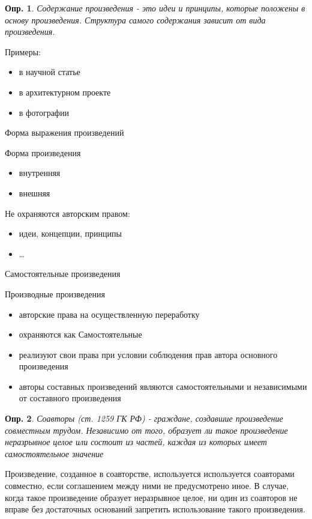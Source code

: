 \documentclass[12pt]{article}
\newtheorem{definition}{Опр.}
\begin{document}
\begin{definition}
Содержание произведения - это идеи и принципы, которые положены в основу
произведения. Структура самого содержания зависит от вида произведения.
\end{definition}

Примеры:
\begin{itemize}
\item в научной статье
\item в архитектурном проекте
\item в фотографии
\end{itemize}

Форма выражения произведений

Форма произведения
\begin{itemize}
\item внутренняя
\item внешняя
\end{itemize}

Не охраняются авторским правом:
\begin{itemize}
\item идеи, концепции, принципы
\item \dots
\end{itemize}

Самостоятельные произведения

Производные произведения
\begin{itemize}
\item авторские права на осуществленную переработку
\item охраняются как Самостоятельные
\item реализуют свои права при условии соблюдения прав автора
основного произведения
\item авторы составных произведений являются самостоятельными
и независимыми от составного произведения
\end{itemize}

\begin{definition}
Соавторы (ст. 1259 ГК РФ) - граждане, создавшие произведение 
совместным трудом. Независимо от того, образует ли такое произведение
неразрывное целое или состоит из частей, каждая из которых имеет 
самостоятельное значение
\end{definition}

Произведение, созданное в соавторстве, используется используется соавторами совместно, если соглашением между ними не предусмотрено иное. В случае, когда такое произведение образует неразрывное целое, ни один из соавторов не вправе без достаточных оснований запретить использование такого произведения.
\end{document}
